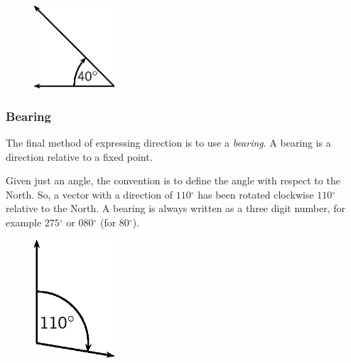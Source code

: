 	\begin{figure}[H] %
    \begin{center}
    \label{m38812*id187367!!!underscore!!!media}\label{m38812*id187367!!!underscore!!!printimage}\includegraphics[width=3cm]{col11305.imgs/m38812_PG11C1_005.png} %
      \vspace{2pt}
    \vspace{.1in}
    \end{center}
 \end{figure}       \par 
      \label{m38812*uid7}
            \subsubsection{ Bearing}
            \nopagebreak
        \label{m38812*id187384}The final method of expressing direction is to use a \textsl{bearing}. A bearing is a direction relative to a fixed point.\par 
        \label{m38812*id187393}Given just an angle, the convention is to define the angle with respect to the North. So, a vector with a direction of $110{}^{\circ }$ has been rotated clockwise $110{}^{\circ }$ relative to the North. A bearing is always written as a three digit number, for example $275{}^{\circ }$ or $080{}^{\circ }$ (for $80{}^{\circ }$).\par 
        \label{m38812*id187459}
    \setcounter{subfigure}{0}
	\begin{figure}[H] %
    \begin{center}
    \label{m38812*id187462!!!underscore!!!media}\label{m38812*id187462!!!underscore!!!printimage}\includegraphics[width=3cm]{col11305.imgs/m38812_PG11C1_006.png} %
      \vspace{2pt}
    \vspace{.1in}
    \end{center}
 \end{figure}       
        \par 
\label{m38812*secfhsst!!!underscore!!!id146}

